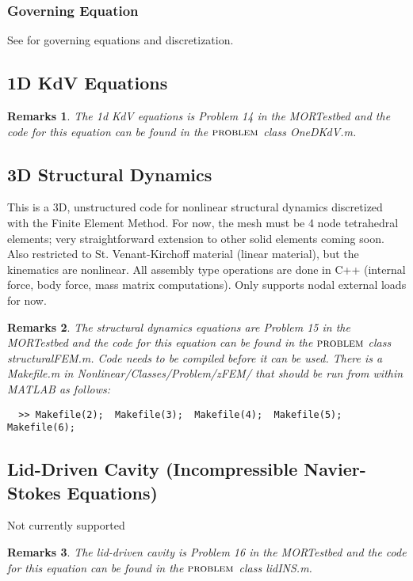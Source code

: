 \documentclass[notitlepage]{report}
\newtheorem*{Rem}{Remarks}
\newcommand{\problem}{\ensuremath{\textsc{problem }}}
\begin{document}
\subsubsection{Governing Equation}
See \cite{maccormacknotes} for governing equations and discretization.

\subsection{1D KdV Equations}
\begin{Rem}
The 1d KdV equations is Problem 14 in the MORTestbed and the code for this equation can be found in the \problem class OneDKdV.m.
\end{Rem}

\subsection{3D Structural Dynamics}
This is a 3D, unstructured code for nonlinear structural dynamics discretized with the Finite Element Method.  For now, the mesh must be 4 node tetrahedral elements; very straightforward extension to other solid elements coming soon.  Also restricted to St. Venant-Kirchoff material (linear material), but the kinematics are nonlinear.  All assembly type operations are done in C++ (internal force, body force, mass matrix computations).  Only supports nodal external loads for now.
\begin{Rem}
The structural dynamics equations are Problem 15 in the MORTestbed and the code for this equation can be found in the \problem class structuralFEM.m.  Code needs to be compiled before it can be used.  There is a Makefile.m in Nonlinear/Classes/Problem/zFEM/ that should be run \emph{from within MATLAB} as follows: 
\begin{verbatim}
  >> Makefile(2);  Makefile(3);  Makefile(4);  Makefile(5);  Makefile(6); 
\end{verbatim}
\end{Rem}

\subsection{Lid-Driven Cavity (Incompressible Navier-Stokes Equations)}
Not currently supported
\begin{Rem}
The lid-driven cavity is Problem 16 in the MORTestbed and the code for this equation can be found in the \problem class lidINS.m.
\end{Rem}
\end{document}

